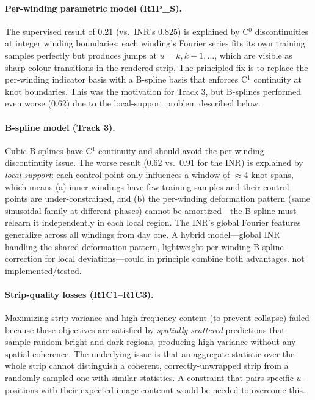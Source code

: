 \documentclass[11pt,a4paper]{article}
\begin{document}
\paragraph{Per-winding parametric model (R1P\_S).} The supervised result of 0.21 (vs.\ INR's 0.825) is explained by C$^0$ discontinuities at integer winding boundaries: each winding's Fourier series fits its own training samples perfectly but produces jumps at $u = k, k+1, \ldots$, which are visible as sharp colour transitions in the rendered strip. The principled fix is to replace the per-winding indicator basis with a B-spline basis that enforces C$^1$ continuity at knot boundaries. This was the motivation for Track 3, but B-splines performed even worse (0.62) due to the local-support problem described below.

\paragraph{B-spline model (Track 3).} Cubic B-splines have C$^1$ continuity and should avoid the per-winding discontinuity issue. The worse result (0.62 vs.\ 0.91 for the INR) is explained by \emph{local support}: each control point only influences a window of $\approx 4$ knot spans, which means (a) inner windings have few training samples and their control points are under-constrained, and (b) the per-winding deformation pattern (same sinusoidal family at different phases) cannot be amortized—the B-spline must relearn it independently in each local region. The INR's global Fourier features generalize across all windings from day one. A hybrid model—global INR handling the shared deformation pattern, lightweight per-winding B-spline correction for local deviations—could in principle combine both advantages. not implemented/tested.

\paragraph{Strip-quality losses (R1C1--R1C3).} Maximizing strip variance and high-frequency content (to prevent collapse) failed because these objectives are satisfied by \emph{spatially scattered} predictions that sample random bright and dark regions, producing high variance without any spatial coherence. The underlying issue is that an aggregate statistic over the whole strip cannot distinguish a coherent, correctly-unwrapped strip from a randomly-sampled one with similar statistics. A constraint that pairs specific $u$-positions with their expected image contennt would be needed to overcome this.
\end{document}
